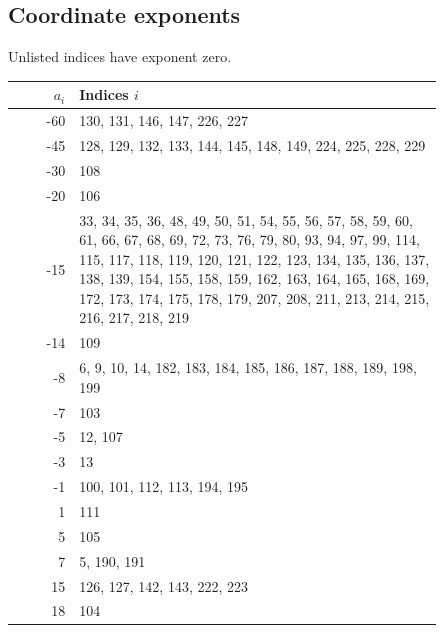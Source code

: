 \documentclass[11pt,a4paper]{article}
\begin{document}
\subsection*{Coordinate exponents}
Unlisted indices have exponent zero.
\begin{longtable}{r p{0.85\linewidth}}
\toprule
$a_i$ & Indices $i$\\
\midrule
\endhead
-60 & 130, 131, 146, 147, 226, 227\\
-45 & 128, 129, 132, 133, 144, 145, 148, 149, 224, 225, 228, 229\\
-30 & 108\\
-20 & 106\\
-15 & 33, 34, 35, 36, 48, 49, 50, 51, 54, 55, 56, 57, 58, 59, 60, 61, 66, 67, 68, 69, 72, 73, 76, 79, 80, 93, 94, 97, 99, 114, 115, 117, 118, 119, 120, 121, 122, 123, 134, 135, 136, 137, 138, 139, 154, 155, 158, 159, 162, 163, 164, 165, 168, 169, 172, 173, 174, 175, 178, 179, 207, 208, 211, 213, 214, 215, 216, 217, 218, 219\\
-14 & 109\\
-8 & 6, 9, 10, 14, 182, 183, 184, 185, 186, 187, 188, 189, 198, 199\\
-7 & 103\\
-5 & 12, 107\\
-3 & 13\\
-1 & 100, 101, 112, 113, 194, 195\\
1 & 111\\
5 & 105\\
7 & 5, 190, 191\\
15 & 126, 127, 142, 143, 222, 223\\
18 & 104\\
\bottomrule
\end{longtable}
\end{document}
